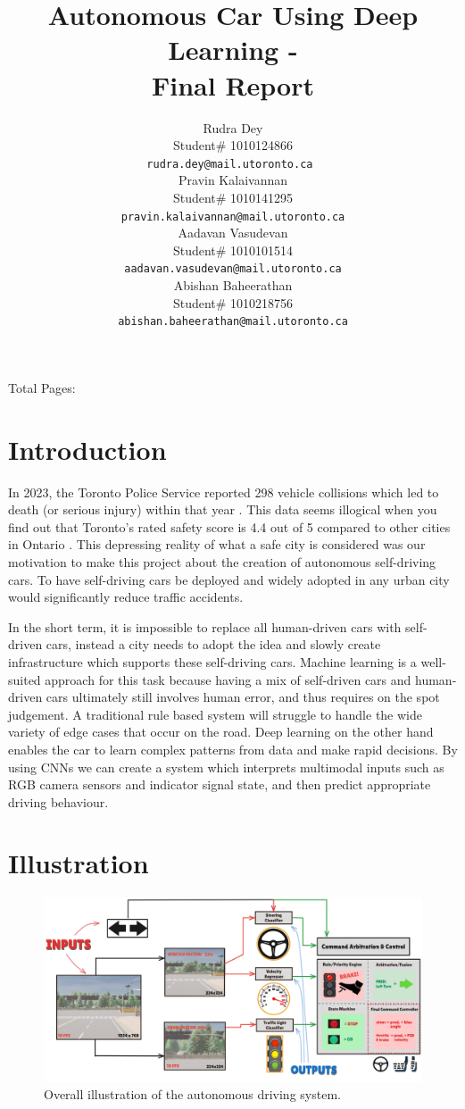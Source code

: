 \documentclass{article} %
\title{Autonomous Car Using Deep Learning - \\Final Report}
\author{Rudra Dey  \\
Student\# 1010124866\\
\texttt{rudra.dey@mail.utoronto.ca } \\
\And
Pravin Kalaivannan  \\
Student\# 1010141295 \\
\texttt{pravin.kalaivannan@mail.utoronto.ca} \\
\AND
Aadavan Vasudevan  \\
Student\# 1010101514 \\
\texttt{aadavan.vasudevan@mail.utoronto.ca} \\
\And
Abishan Baheerathan \\
Student\# 1010218756 \\
\texttt{abishan.baheerathan@mail.utoronto.ca} \\
\AND
}
\begin{document}
\maketitle

Total Pages: \pageref{last_page}


\section{Introduction}

In 2023, the Toronto Police Service reported 298 vehicle collisions which led to death (or serious injury) within that year \citep{toronto-ksi}. This data seems illogical when 
you find out that Toronto’s rated safety score is 4.4 out of 5 compared to other cities in Ontario \citep{brokerlink2025ontario}. 
This depressing reality of what a safe city is considered was our motivation to make this project 
about the creation of autonomous self-driving cars. To have self-driving cars be deployed and widely 
adopted in any urban city would significantly reduce traffic accidents. 

In the short term, it is impossible to replace all human-driven cars with self-driven cars, instead a city needs to adopt the idea and slowly 
create infrastructure which supports these self-driving cars. Machine learning is a well-suited approach for this task because having a mix of 
self-driven cars and human-driven cars ultimately still involves human error, and thus requires on the spot judgement. A traditional rule based 
system will struggle to handle the wide variety of edge cases that occur on the road. Deep learning on the other hand enables the car to learn 
complex patterns from data and make rapid decisions. By using CNNs we can create a system which interprets multimodal inputs such as RGB camera 
sensors and indicator signal state, and then predict appropriate driving behaviour.

\section{Illustration}


\begin{figure}[H] %
    \centering
    \includegraphics[width=1.0\textwidth]{illustration.png} %
    \caption{Overall illustration of the autonomous driving system.}
    \label{fig:illustrationExample}
\end{figure}
\end{document}
